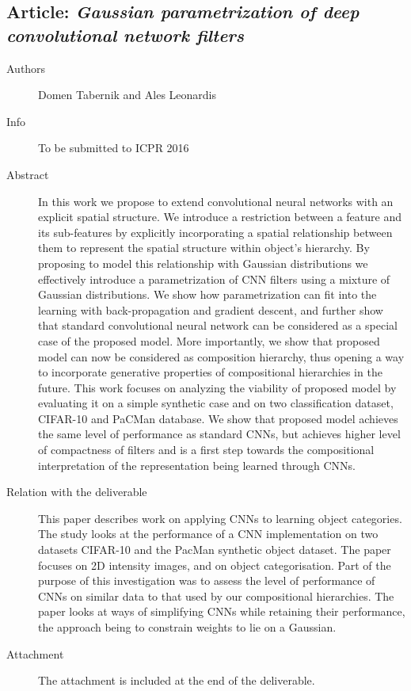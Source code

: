 \documentclass[a4paper,11pt,pdf]{../templates/pacmanreport}
\begin{document}
\subsection{Article: \em Gaussian parametrization of deep convolutional network filters}
\begin{description}
    \item[Authors] Domen Tabernik and Ales Leonardis
    \item[Info] To be submitted to ICPR 2016%
    \item[Abstract] In this work we propose to extend convolutional neural networks with an explicit spatial structure. We introduce
a restriction between a feature and its sub-features by explicitly incorporating a spatial relationship between them to represent
the spatial structure within object’s hierarchy. By proposing to model this relationship with Gaussian distributions we effectively
introduce a parametrization of CNN filters using a mixture of Gaussian distributions. We show how parametrization can fit
into the learning with back-propagation and gradient descent, and further show that standard convolutional neural network
can be considered as a special case of the proposed model. More importantly, we show that proposed model can now be
considered as composition hierarchy, thus opening a way to incorporate generative properties of compositional hierarchies
in the future. This work focuses on analyzing the viability of proposed model by evaluating it on a simple synthetic case and on
two classification dataset, CIFAR-10 and PaCMan database. We show that proposed model achieves the same level of performance
as standard CNNs, but achieves higher level of compactness of filters and is a first step towards the compositional interpretation
of the representation being learned through CNNs.
    \item [Relation with the deliverable] This paper describes work on applying CNNs to learning object categories. The study looks at the performance of a CNN implementation on two datasets CIFAR-10 and the PacMan synthetic object dataset. The paper focuses on 2D intensity images, and on object categorisation. Part of the purpose of this investigation was to assess the level of performance of CNNs on similar data to that used by our compositional hierarchies. The paper looks at ways of simplifying CNNs while retaining their performance, the approach being to constrain weights to lie on a Gaussian. 
    \item[Attachment] The attachment is included at the end of the deliverable. %
\end{description}
\newpage
\end{document}
